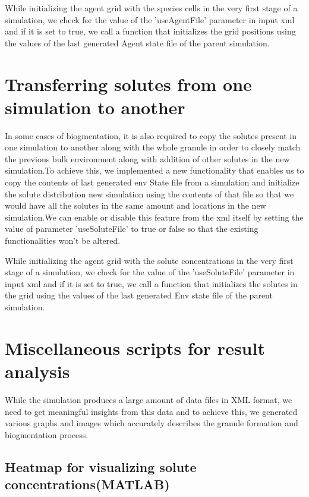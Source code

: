 While initializing the agent grid with the species cells in the very first stage of a simulation, we check for the value of the 'useAgentFile' parameter in input xml and if it is set to true, we call a function that initializes the grid positions using the values of the last generated Agent state file of the parent simulation.  

\section{Transferring solutes from one simulation to another}

In some cases of biogmentation, it is also required to copy the solutes present in one simulation to another along with the whole granule in order to closely match the previous bulk environment along with addition of other solutes in the new simulation.To achieve this, we implemented a new functionality that enables us to copy the contents of last generated env State file from a simulation and initialize the solute distribution new simulation using the contents of that file so that we would have all the solutes in the same amount and locations in the new simulation.We can enable or disable this feature from the xml itself by setting the value of parameter 'useSoluteFile' to true or false so that the existing functionalities won't be altered.

While initializing the agent grid with the solute concentrations in the very first stage of a simulation, we check for the value of the 'useSoluteFile' parameter in input xml and if it is set to true, we call a function that initializes the solutes in the grid using the values of the last generated Env state file of the parent simulation.  

\section{Miscellaneous scripts for result analysis}

While the simulation produces a large amount of data files in XML format, we need to get meaningful insights from this data and to achieve this, we generated various graphs and images which accurately describes the granule formation and biogmentation process. 

\subsection{Heatmap for visualizing solute concentrations(MATLAB)}

